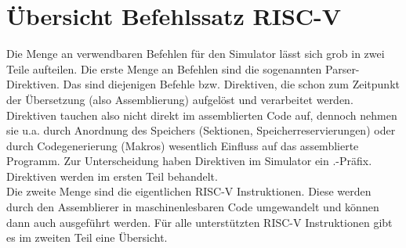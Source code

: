 
\section{Übersicht Befehlssatz RISC-V}
Die Menge an verwendbaren Befehlen für den Simulator lässt sich grob in zwei Teile aufteilen. Die erste Menge an Befehlen sind die sogenannten Parser-Direktiven. Das sind diejenigen Befehle bzw. Direktiven, die schon zum Zeitpunkt der Übersetzung (also Assemblierung) aufgelöst und verarbeitet werden. Direktiven tauchen also nicht direkt im assemblierten Code auf, dennoch nehmen sie u.a. durch Anordnung des Speichers (Sektionen, Speicherreservierungen) oder durch Codegenerierung (Makros) wesentlich Einfluss auf das assemblierte Programm. Zur Unterscheidung haben Direktiven im Simulator ein .-Präfix. Direktiven werden im ersten Teil behandelt.\\
Die zweite Menge sind die eigentlichen RISC-V Instruktionen. Diese werden durch den Assemblierer in maschinenlesbaren Code umgewandelt und können dann auch ausgeführt werden. Für alle unterstützten RISC-V Instruktionen gibt es im zweiten Teil eine Übersicht.

